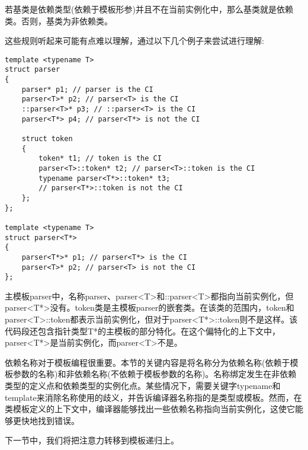 \begin{tcolorbox}[breakable,enhanced jigsaw,colback=blue!5!white,colframe=blue!75!black,title={Note}]
若基类是依赖类型(依赖于模板形参)并且不在当前实例化中，那么基类就是依赖类。否则，基类为非依赖类。
\end{tcolorbox}

这些规则听起来可能有点难以理解，通过以下几个例子来尝试进行理解:

\begin{lstlisting}[style=styleCXX]
template <typename T>
struct parser
{
	parser* p1; // parser is the CI
	parser<T>* p2; // parser<T> is the CI
	::parser<T>* p3; // ::parser<T> is the CI
	parser<T*> p4; // parser<T*> is not the CI
	
	struct token
	{
		token* t1; // token is the CI
		parser<T>::token* t2; // parser<T>::token is the CI
		typename parser<T*>::token* t3;
		// parser<T*>::token is not the CI
	};
};

template <typename T>
struct parser<T*>
{
	parser<T*>* p1; // parser<T*> is the CI
	parser<T>* p2; // parser<T> is not the CI
};
\end{lstlisting}

主模板parser中，名称parser、parser<T>和::parser<T>都指向当前实例化，但parser<T*>没有。token类是主模板parser的嵌套类。在该类的范围内，token和parser<T>::token都表示当前实例化，但对于parser<T*>::token则不是这样。该代码段还包含指针类型T*的主模板的部分特化。在这个偏特化的上下文中，parser<T*>是当前实例化，而parser<T>不是。

依赖名称对于模板编程很重要。本节的关键内容是将名称分为依赖名称(依赖于模板参数的名称)和非依赖名称(不依赖于模板参数的名称)。名称绑定发生在非依赖类型的定义点和依赖类型的实例化点。某些情况下，需要关键字typename和template来消除名称使用的歧义，并告诉编译器名称指的是类型或模板。然而，在类模板定义的上下文中，编译器能够找出一些依赖名称指向当前实例化，这使它能够更快地找到错误。

下一节中，我们将把注意力转移到模板递归上。























